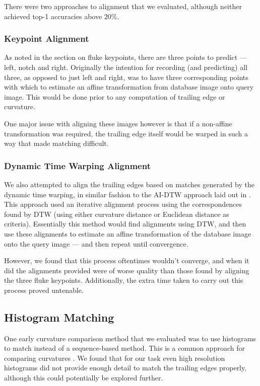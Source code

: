 There were two approaches to alignment that we evaluated, although neither achieved top-1 accuracies above $20\%$.

\subsubsection{Keypoint Alignment}

As noted in the section on fluke keypoints, there are three points to predict --- left, notch and right.
Originally the intention for recording (and predicting) all three, as opposed to just left and right, was to have three corresponding points with which to estimate an affine transformation from database image onto query image.
This would be done prior to any computation of trailing edge or curvature.

One major issue with aligning these images however is that if a non-affine transformation was required, the trailing edge itself would be warped in such a way that made matching difficult.

\subsubsection{Dynamic Time Warping Alignment}

We also attempted to align the trailing edges based on matches generated by the dynamic time warping, in similar fashion to the AI-DTW approach laid out in \cite{qiao2006affine}.
This approach used an iterative alignment process using the correspondences found by DTW (using either curvature distance or Euclidean distance as criteria).
Essentially this method would find alignments using DTW, and then use these alignments to estimate an affine transformation of the database image onto the query image --- and then repeat until convergence.

However, we found that this process oftentimes wouldn't converge, and when it did the alignments provided were of worse quality than those found by aligning the three fluke keypoints.
Additionally, the extra time taken to carry out this process proved untenable.

\subsection{Histogram Matching}

One early curvature comparison method that we evaluated was to use histograms to match instead of a sequence-based method.
This is a common approach for comparing curvatures \cite{kumar2012leafsnap}.
We found that for our task even high resolution histograms did not provide enough detail to match the trailing edges properly, although this could potentially be explored further.

